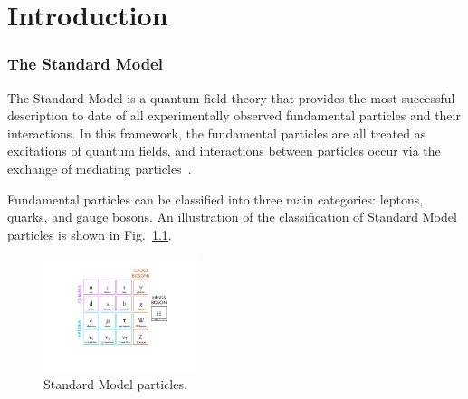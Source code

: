 \chapter{Introduction\label{sec:intro}}



\subsection{The Standard Model\label{sec:SM}}

The Standard Model is a quantum field theory that provides the most successful description to date of all experimentally observed fundamental particles and their interactions. In this framework, the fundamental particles are all treated as excitations of quantum fields, and interactions between particles occur via the exchange of mediating particles~\cite{BettiniPhysics}.

Fundamental particles can be classified into three main categories: leptons, quarks, and gauge bosons. An illustration of the classification of Standard Model particles is shown in Fig.~\ref{fig:StandardModelTable}.

\begin{figure}
   \begin{center}
      \includegraphics[width=0.4\textwidth]{figures/StandardModelTable}
      \caption{Standard Model particles.}
      \label{fig:StandardModelTable}
   \end{center}
\end{figure}

